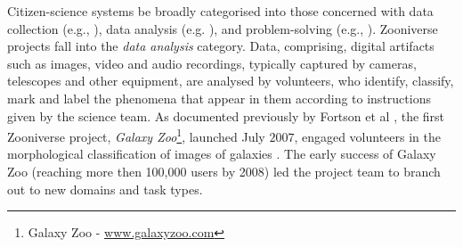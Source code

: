 \documentclass{sigchi}
\begin{document}
Citizen-science systems be broadly categorised into those concerned with data collection (e.g., \cite{zook2010volunteered,wood2011ebird}), data analysis (e.g. \cite{westphal2005stardust,heinzelman2010crowdsourcing}), and problem-solving (e.g., \cite{khatib2011algorithm,cordero2012rna}).  Zooniverse projects fall into the \emph{data analysis} category.  Data, comprising, digital artifacts such as images, video and audio recordings, typically captured by cameras, telescopes and other equipment, are analysed by volunteers, who identify, classify, mark and label the phenomena that appear in them according to instructions given by the science team. As documented previously by Fortson et al \cite{fortson2011galaxy}, the first Zooniverse project, \emph{Galaxy Zoo}\footnote{Galaxy Zoo - \url{www.galaxyzoo.com}}, launched July $2007$, engaged volunteers in the morphological classification of images of galaxies \cite{galaxyzoo-launch}. The early success of Galaxy Zoo (reaching more then 100,000 users by 2008) led the project team to branch out to new domains and task types. 

\end{document}
